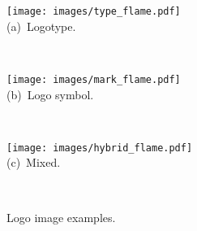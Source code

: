 \documentclass[runningheads]{llncs}
\begin{document}
\begin{figure}[t]
 \begin{minipage}{0.30\textwidth}
  \centering
   \texttt{[image: images/type\_flame.pdf]}\\
      (a)~Logotype.
 \end{minipage}
 \ 
 \begin{minipage}{0.30\textwidth}
  \centering
  \texttt{[image: images/mark\_flame.pdf]}\\
   (b)~Logo symbol.
 \end{minipage}
 \ 
 \begin{minipage}{0.30\textwidth}
  \centering
  \texttt{[image: images/hybrid\_flame.pdf]}\\
   (c)~Mixed.
 \end{minipage}\\[-3mm]
 \caption{Logo image examples.} %
 \label{fig:logo-example}
\end{figure}
\end{document}
